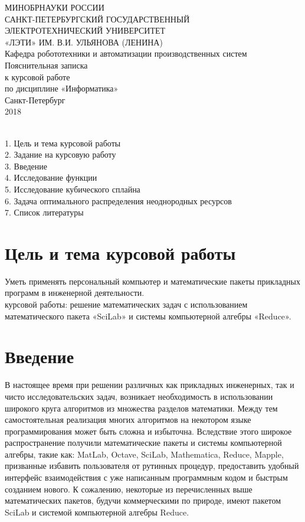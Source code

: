 \documentclass[russian,utf8,nocolumnxxxi,nocolumnxxxii]{eskdtext}
\begin{document}
\begin{center}
МИНОБРНАУКИ РОССИИ
\\САНКТ-ПЕТЕРБУРГСКИЙ ГОСУДАРСТВЕННЫЙ
\\ЭЛЕКТРОТЕХНИЧЕСКИЙ УНИВЕРСИТЕТ
\\«ЛЭТИ» ИМ. В.И. УЛЬЯНОВА (ЛЕНИНА)
\\Кафедра робототехники и автоматизации производственных систем
\vspace{30ex}
\\Пояснительная записка
\\к курсовой работе
\\по дисциплине «Информатика»
\vspace{40ex}
\\Санкт-Петербург
\\2018
\end{center}

\newpage
{}
\\1. Цель и тема курсовой работы
\\2. Задание на курсовую работу
\\3. Введение
\\4. Исследование функции
\\5. Исследование кубического сплайна
\\6. Задача оптимального распределения неоднородных ресурсов
\\7. Список литературы

\newpage
\section{Цель и тема курсовой работы}
 Уметь применять персональный компьютер и математические пакеты прикладных программ в инженерной деятельности.
\\{ курсовой работы:} решение математических задач с использованием математического пакета «SciLab» и системы компьютерной алгебры «Reduce».

\newpage
\section{Введение}
В настоящее время при решении различных как прикладных инженерных, так и чисто исследовательских задач, возникает необходимость в использовании широкого круга алгоритмов из множества разделов математики. Между тем самостоятельная реализация многих алгоритмов на некотором языке программирования может быть сложна и избыточна. Вследствие этого широкое распространение получили математические пакеты и системы компьютерной алгебры, такие как: MatLab, Octave, SciLab, Mathematica, Reduce, Mapple, призванные избавить пользователя от рутинных процедур, предоставить удобный интерфейс взаимодействия с уже написанным программным кодом и быстрым созданием нового. К сожалению, некоторые из перечисленных выше математических пакетов, будучи коммерческими по природе, имеют пакетом SciLab и системой компьютерной алгебры Reduce.
\end{document}
